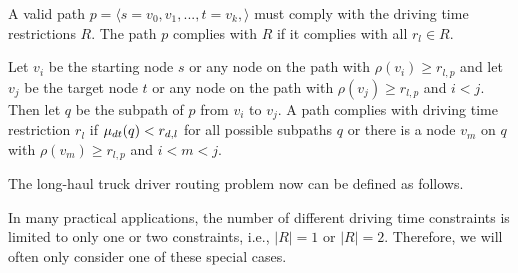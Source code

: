 \begin{definition}
	A valid path $p = \langle s=v_0,v_1,...,t=v_k, \rangle$ must comply with the driving time restrictions $R$. The path $p$ complies with $R$ if it complies with all $r_l \in R$.

	Let $v_i$ be the starting node $s$ or any node on the path with $\rho(v_i) \ge r_{l,p}$ and let $v_j$ be the target node $t$ or any node on the path with $\rho(v_j) \ge r_{l,p}$ and $i < j$. Then let $q$ be the subpath of $p$ from $v_i$ to $v_j$. A path complies with driving time restriction $r_l$ if $\mu_{dt}(q) < r_{d,l}$ for all possible subpaths $q$ or there is a node $v_m$ on $q$ with $\rho(v_m) \ge r_{l,p}$ and $i < m < j$.
\end{definition}

The long-haul truck driver routing problem now can be defined as follows.

\begin{namedproblem}
\end{namedproblem}

In many practical applications, the number of different driving time constraints is limited to only one or two constraints, i.e., $|R| = 1$ or  $|R| = 2$. Therefore, we will often only consider one of these special cases.